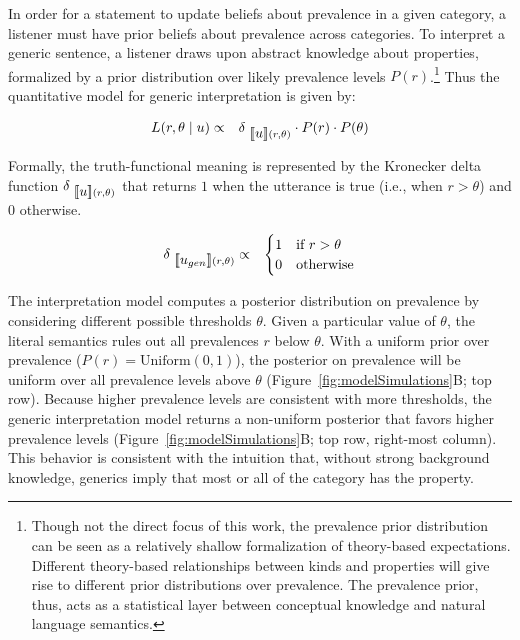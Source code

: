 \documentclass[floatsintext,doc]{apa6}
\theoremstyle{definition}
\theoremstyle{definition}
\theoremstyle{definition}
\theoremstyle{remark}
\begin{document}
In order for a statement to update beliefs about prevalence in a given category, a listener
must have prior beliefs about prevalence across categories. To interpret a generic
sentence, a listener draws upon abstract knowledge about properties,
formalized by a prior distribution over likely prevalence levels
\(P(r)\).\footnote{Though not the direct focus of this work, the
  prevalence prior distribution can be seen as a relatively shallow
  formalization of theory-based expectations. Different theory-based
  relationships between kinds and properties will give rise to different
  prior distributions over prevalence. The prevalence prior, thus, acts
  as a statistical layer between conceptual knowledge and natural
  language semantics.} Thus the quantitative model for generic
interpretation is given by:

\begin{eqnarray}
L(r, \theta \mid u) &\propto& {\delta_{\mbox{ $[\![ u ]\!]$}(r, \theta)} \cdot P(r) \cdot P(\theta)} \label{eq:L0}
\end{eqnarray}

Formally, the truth-functional meaning is represented by the Kronecker
delta function \(\delta_{\mbox{ $[\![ u ]\!]$}(r, \theta)}\) that returns
\(1\) when the utterance is true (i.e.,
when \(r > \theta\)) and \(0\) otherwise.

\begin{eqnarray}
\delta_{\mbox{ $[\![ u_{gen} ]\!]$}(r, \theta)} &\propto  & \begin{cases}
1 & \text{if } r > \theta \\
0 & \text{otherwise}
\end{cases}\label{eq:delta}
\end{eqnarray}

The interpretation model computes a posterior distribution on prevalence
by considering different possible thresholds \(\theta\). Given a
particular value of \(\theta\), the literal semantics rules out all
prevalences \(r\) below \(\theta\). With a uniform prior over prevalence
(\(P(r) = \text{Uniform}(0, 1)\)), the posterior on prevalence will be
uniform over all prevalence levels above \(\theta\)
(Figure~\ref{fig:modelSimulations}B; top row). Because higher prevalence
levels are consistent with more thresholds, the generic interpretation
model returns a non-uniform posterior that favors higher prevalence
levels (Figure~\ref{fig:modelSimulations}B; top row, right-most column).
This behavior is consistent with the intuition that, without strong
background knowledge, generics imply that most or all of the category
has the property.
\end{document}
